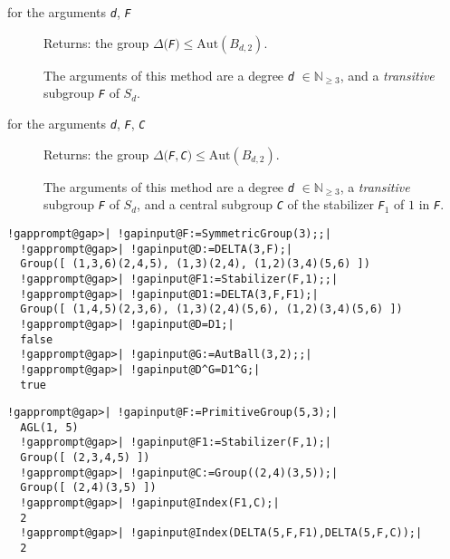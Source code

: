\documentclass[a4paper,11pt]{report}
\begin{document}
{{{ 
\begin{description}
\item[{for the arguments \mbox{\texttt{\mdseries\slshape d}}, \mbox{\texttt{\mdseries\slshape F}}}]  Returns: the group $\Delta($\mbox{\texttt{\mdseries\slshape F}}$)\le\mathrm{Aut}(B_{d,2})$. 

 The arguments of this method are a degree \mbox{\texttt{\mdseries\slshape d}} $\in\mathbb{N}_{\ge 3}$, and a \emph{transitive} subgroup \mbox{\texttt{\mdseries\slshape F}} of $S_{d}$. 
\item[{for the arguments \mbox{\texttt{\mdseries\slshape d}}, \mbox{\texttt{\mdseries\slshape F}}, \mbox{\texttt{\mdseries\slshape C}}}]  Returns: the group $\Delta($\mbox{\texttt{\mdseries\slshape F}}$,$\mbox{\texttt{\mdseries\slshape C}}$)\le\mathrm{Aut}(B_{d,2})$. 

 The arguments of this method are a degree \mbox{\texttt{\mdseries\slshape d}} $\in\mathbb{N}_{\ge 3}$, a \emph{transitive} subgroup \mbox{\texttt{\mdseries\slshape F}} of $S_d$, and a central subgroup \mbox{\texttt{\mdseries\slshape C}} of the stabilizer \mbox{\texttt{\mdseries\slshape F}}$_{1}$ of $1$ in \mbox{\texttt{\mdseries\slshape F}}. 
\end{description}
 

 }

 

 
\begin{Verbatim}[commandchars=!@|,fontsize=\small,frame=single,label=Example]
  !gapprompt@gap>| !gapinput@F:=SymmetricGroup(3);;|
  !gapprompt@gap>| !gapinput@D:=DELTA(3,F);|
  Group([ (1,3,6)(2,4,5), (1,3)(2,4), (1,2)(3,4)(5,6) ])
  !gapprompt@gap>| !gapinput@F1:=Stabilizer(F,1);;|
  !gapprompt@gap>| !gapinput@D1:=DELTA(3,F,F1);|
  Group([ (1,4,5)(2,3,6), (1,3)(2,4)(5,6), (1,2)(3,4)(5,6) ])
  !gapprompt@gap>| !gapinput@D=D1;|
  false
  !gapprompt@gap>| !gapinput@G:=AutBall(3,2);;|
  !gapprompt@gap>| !gapinput@D^G=D1^G;|
  true
\end{Verbatim}
 

 
\begin{Verbatim}[commandchars=!@|,fontsize=\small,frame=single,label=Example]
  !gapprompt@gap>| !gapinput@F:=PrimitiveGroup(5,3);|
  AGL(1, 5)
  !gapprompt@gap>| !gapinput@F1:=Stabilizer(F,1);|
  Group([ (2,3,4,5) ])
  !gapprompt@gap>| !gapinput@C:=Group((2,4)(3,5));|
  Group([ (2,4)(3,5) ])
  !gapprompt@gap>| !gapinput@Index(F1,C);|
  2
  !gapprompt@gap>| !gapinput@Index(DELTA(5,F,F1),DELTA(5,F,C));|
  2
\end{Verbatim}
 

}}
\end{document}
